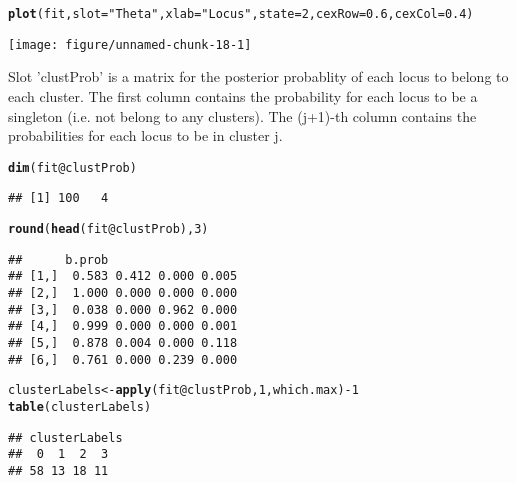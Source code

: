 \documentclass[a4paper,10pt]{article}\usepackage[]{graphicx}\usepackage[]{color}
\makeatletter
\def\maxwidth{ %
  \ifdim\Gin@nat@width>\linewidth
    \linewidth
  \else
    \Gin@nat@width
  \fi
}
\newcommand{\hlnum}[1]{\textcolor[rgb]{0.686,0.059,0.569}{#1}}%
\newcommand{\hlstr}[1]{\textcolor[rgb]{0.192,0.494,0.8}{#1}}%
\newcommand{\hlopt}[1]{\textcolor[rgb]{0,0,0}{#1}}%
\newcommand{\hlstd}[1]{\textcolor[rgb]{0.345,0.345,0.345}{#1}}%
\newcommand{\hlkwb}[1]{\textcolor[rgb]{0.69,0.353,0.396}{#1}}%
\newcommand{\hlkwc}[1]{\textcolor[rgb]{0.333,0.667,0.333}{#1}}%
\newcommand{\hlkwd}[1]{\textcolor[rgb]{0.737,0.353,0.396}{\textbf{#1}}}%
\newenvironment{kframe}{%
 \def\at@end@of@kframe{}%
 \ifinner\ifhmode%
  \def\at@end@of@kframe{\end{minipage}}%
  \begin{minipage}{\columnwidth}%
 \fi\fi%
 \def\FrameCommand##1{\hskip\@totalleftmargin \hskip-\fboxsep
 \colorbox{shadecolor}{##1}\hskip-\fboxsep
     \hskip-\linewidth \hskip-\@totalleftmargin \hskip\columnwidth}%
 \MakeFramed {\advance\hsize-\width
   \@totalleftmargin\z@ \linewidth\hsize
   \@setminipage}}%
 {\par\unskip\endMakeFramed%
 \at@end@of@kframe}
\newenvironment{knitrout}{}{} %
\makeatother
\begin{document}
\begin{knitrout}
\color{fgcolor}\begin{kframe}
\begin{alltt}
\hlkwd{plot}\hlstd{(fit,} \hlkwc{slot} \hlstd{=} \hlstr{"Theta"}\hlstd{,} \hlkwc{xlab} \hlstd{=} \hlstr{"Locus"}\hlstd{,} \hlkwc{state} \hlstd{=} \hlnum{2}\hlstd{,} \hlkwc{cexRow} \hlstd{=} \hlnum{0.6}\hlstd{,} \hlkwc{cexCol} \hlstd{=} \hlnum{0.4}\hlstd{)}
\end{alltt}
\end{kframe}

{\centering \texttt{[image: figure/unnamed-chunk-18-1]} 

}



\end{knitrout}

Slot 'clustProb' is a matrix for the posterior probablity of each locus to belong to each cluster. The first column contains the probability for each locus to be a singleton (i.e. not belong to any clusters). The (j+1)-th column contains the probabilities for each locus to be in cluster j.

\begin{knitrout}
\color{fgcolor}\begin{kframe}
\begin{alltt}
\hlkwd{dim}\hlstd{(fit}\hlopt{@}\hlkwc{clustProb}\hlstd{)}
\end{alltt}
\begin{verbatim}
## [1] 100   4
\end{verbatim}
\begin{alltt}
\hlkwd{round}\hlstd{(}\hlkwd{head}\hlstd{(fit}\hlopt{@}\hlkwc{clustProb}\hlstd{),} \hlnum{3}\hlstd{)}
\end{alltt}
\begin{verbatim}
##      b.prob                  
## [1,]  0.583 0.412 0.000 0.005
## [2,]  1.000 0.000 0.000 0.000
## [3,]  0.038 0.000 0.962 0.000
## [4,]  0.999 0.000 0.000 0.001
## [5,]  0.878 0.004 0.000 0.118
## [6,]  0.761 0.000 0.239 0.000
\end{verbatim}
\begin{alltt}
\hlstd{clusterLabels} \hlkwb{<-} \hlkwd{apply}\hlstd{(fit}\hlopt{@}\hlkwc{clustProb}\hlstd{,} \hlnum{1}\hlstd{, which.max)} \hlopt{-} \hlnum{1}
\hlkwd{table}\hlstd{(clusterLabels)}
\end{alltt}
\begin{verbatim}
## clusterLabels
##  0  1  2  3 
## 58 13 18 11
\end{verbatim}
\end{kframe}
\end{knitrout}
\end{document}
